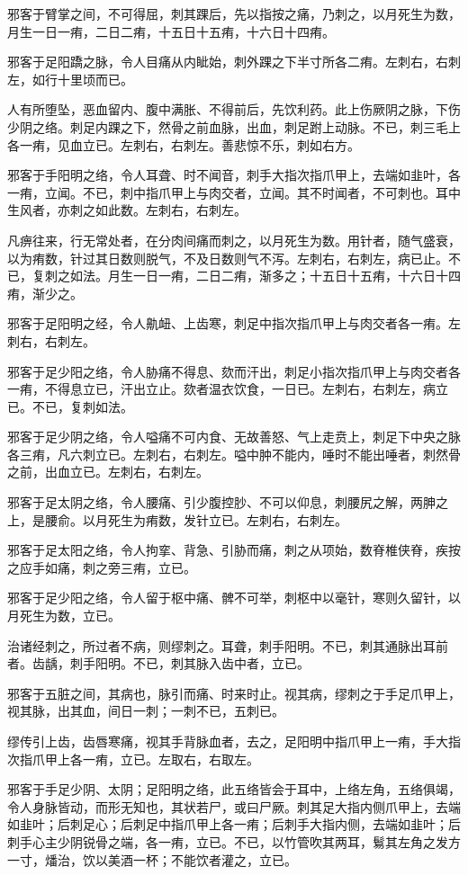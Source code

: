 \documentclass{article}%
\begin{document}
邪客于臂掌之间，不可得屈，刺其踝后，先以指按之痛，乃刺之，以月死生为数，月生一日一痏，二日二痏，十五日十五痏，十六日十四痏。

邪客于足阳蹻之脉，令人目痛从内眦始，刺外踝之下半寸所各二痏。左刺右，右刺左，如行十里顷而已。

人有所堕坠，恶血留内、腹中满胀、不得前后，先饮利药。此上伤厥阴之脉，下伤少阴之络。刺足内踝之下，然骨之前血脉，出血，刺足跗上动脉。不已，刺三毛上各一痏，见血立已。左刺右，右刺左。善悲惊不乐，刺如右方。

邪客于手阳明之络，令人耳聋、时不闻音，刺手大指次指爪甲上，去端如韭叶，各一痏，立闻。不已，刺中指爪甲上与肉交者，立闻。其不时闻者，不可刺也。耳中生风者，亦刺之如此数。左刺右，右刺左。

凡痹往来，行无常处者，在分肉间痛而刺之，以月死生为数。用针者，随气盛衰，以为痏数，针过其日数则脱气，不及日数则气不泻。左刺右，右刺左，病已止。不已，复刺之如法。月生一日一痏，二日二痏，渐多之；十五日十五痏，十六日十四痏，渐少之。

邪客于足阳明之经，令人鼽衄、上齿寒，刺足中指次指爪甲上与肉交者各一痏。左刺右，右刺左。

邪客于足少阳之络，令人胁痛不得息、欬而汗出，刺足小指次指爪甲上与肉交者各一痏，不得息立已，汗出立止。欬者温衣饮食，一日已。左刺右，右刺左，病立已。不已，复刺如法。

邪客于足少阴之络，令人嗌痛不可内食、无故善怒、气上走贲上，刺足下中央之脉各三痏，凡六刺立已。左刺右，右刺左。嗌中肿不能内，唾时不能出唾者，刺然骨之前，出血立已。左刺右，右刺左。

邪客于足太阴之络，令人腰痛、引少腹控䏚、不可以仰息，刺腰尻之解，两胂之上，是腰俞。以月死生为痏数，发针立已。左刺右，右刺左。

邪客于足太阳之络，令人拘挛、背急、引胁而痛，刺之从项始，数脊椎侠脊，疾按之应手如痛，刺之旁三痏，立已。

邪客于足少阳之络，令人留于枢中痛、髀不可举，刺枢中以毫针，寒则久留针，以月死生为数，立已。

治诸经刺之，所过者不病，则缪刺之。耳聋，刺手阳明。不已，刺其通脉出耳前者。齿龋，刺手阳明。不已，刺其脉入齿中者，立已。

邪客于五脏之间，其病也，脉引而痛、时来时止。视其病，缪刺之于手足爪甲上，视其脉，出其血，间日一刺；一刺不已，五刺已。

缪传引上齿，齿唇寒痛，视其手背脉血者，去之，足阳明中指爪甲上一痏，手大指次指爪甲上各一痏，立已。左取右，右取左。

邪客于手足少阴、太阴；足阳明之络，此五络皆会于耳中，上络左角，五络俱竭，令人身脉皆动，而形无知也，其状若尸，或曰尸厥。刺其足大指内侧爪甲上，去端如韭叶；后刺足心；后刺足中指爪甲上各一痏；后刺手大指内侧，去端如韭叶；后刺手心主少阴锐骨之端，各一痏，立已。不已，以竹管吹其两耳，鬄其左角之发方一寸，燔治，饮以美酒一杯；不能饮者灌之，立已。
\end{document}
